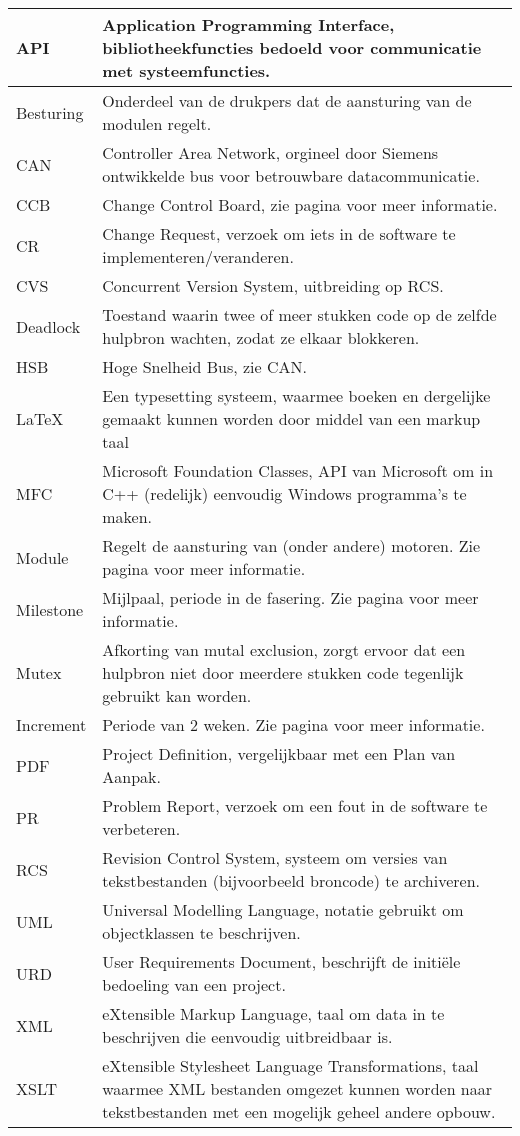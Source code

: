 \begin{longtable}{|l|X|}
\hline
\index{API}API&Application Programming Interface, bibliotheekfuncties bedoeld voor communicatie met systeemfuncties.\\
\hline
\index{Besturing}Besturing&Onderdeel van de drukpers dat de aansturing van de modulen regelt.\\
\hline
\index{CAN}CAN&Controller Area Network, orgineel door Siemens ontwikkelde bus voor betrouwbare datacommunicatie.\\
\hline
\index{CCB}CCB&Change Control Board, zie pagina \pageref{CCB} voor meer informatie.\\
\hline
\index{CR}CR&Change Request, verzoek om iets in de software te implementeren/veranderen.\\
\hline
\index{CVS}CVS&Concurrent Version System, uitbreiding op RCS.\\
\hline
\index{Deadlock}Deadlock&Toestand waarin twee of meer stukken code op de zelfde hulpbron wachten, zodat ze elkaar blokkeren.\\
\hline
\index{HSB}HSB&Hoge Snelheid Bus, zie CAN.\\
\hline
\index{LaTeX}\LaTeX&Een typesetting systeem, waarmee boeken en dergelijke gemaakt kunnen worden door middel van een markup taal \\
\hline
\index{MFC}MFC&Microsoft Foundation Classes, API van Microsoft om in C++ (redelijk) eenvoudig Windows programma's te maken.\\
\hline
\index{Module}Module&Regelt de aansturing van (onder andere) motoren. Zie pagina \pageref{module} voor meer informatie.\\
\hline
\index{Milestones}Milestone&Mijlpaal, periode in de fasering. Zie pagina \pageref{fasering} voor meer informatie.\\
\hline
\index{Mutex}Mutex&Afkorting van mutal exclusion, zorgt ervoor dat een hulpbron niet door meerdere stukken code tegenlijk gebruikt kan worden.\\
\hline
\index{Increments}Increment&Periode van 2 weken. Zie pagina \pageref{proces} voor meer informatie.\\
\hline
\index{PDF}PDF&Project Definition, vergelijkbaar met een Plan van Aanpak.\\
\hline
\index{PR}PR&Problem Report, verzoek om een fout in de software te verbeteren.\\
\hline
\index{RCS}RCS&Revision Control System, systeem om versies van tekstbestanden (bijvoorbeeld broncode) te archiveren.\\
\hline
\index{UML}UML&Universal Modelling Language, notatie gebruikt om objectklassen te beschrijven.\\
\hline
\index{URD}URD&User Requirements Document, beschrijft de initi\"ele bedoeling van een project.\\
\hline
\index{XML}XML&eXtensible Markup Language, taal om data in te beschrijven die eenvoudig uitbreidbaar is.\\
\hline
\index{XSLT}XSLT&eXtensible Stylesheet Language Transformations, taal waarmee XML bestanden omgezet kunnen worden naar tekstbestanden met een mogelijk geheel andere opbouw.\\
\hline
\end{longtable}
